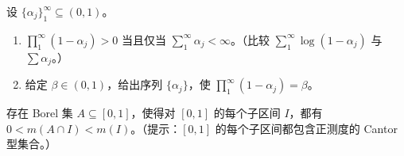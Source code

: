 \documentclass[../../main.tex]{subfiles}%
\begin{document}
\begin{exercise}\label{exercise:ch01-cantor-infinite-product}
设 $\{\alpha_j\}_1^\infty\subseteq(0,1)$。
\begin{enumerate}[label=\alph*.,ref=(\alph*)]
\item\label{item:ch01-infinite-product-positive} $\prod_1^\infty(1-\alpha_j)>0$ 当且仅当 $\sum_1^\infty\alpha_j<\infty$。（比较 $\sum_1^\infty\log(1-\alpha_j)$ 与 $\sum\alpha_j$。）
\item\label{item:ch01-infinite-product-prescribed} 给定 $\beta\in(0,1)$，给出序列 $\{\alpha_j\}$，使 $\prod_1^\infty(1-\alpha_j)=\beta$。
\end{enumerate}
\end{exercise}

\begin{exercise}\label{exercise:ch01-borel-intermediate-density}
存在 Borel 集 $A\subseteq[0,1]$，使得对 $[0,1]$ 的每个子区间 $I$，都有 $0<m(A\cap I)<m(I)$。（提示：$[0,1]$ 的每个子区间都包含正测度的 Cantor 型集合。）
\end{exercise}
\end{document}

